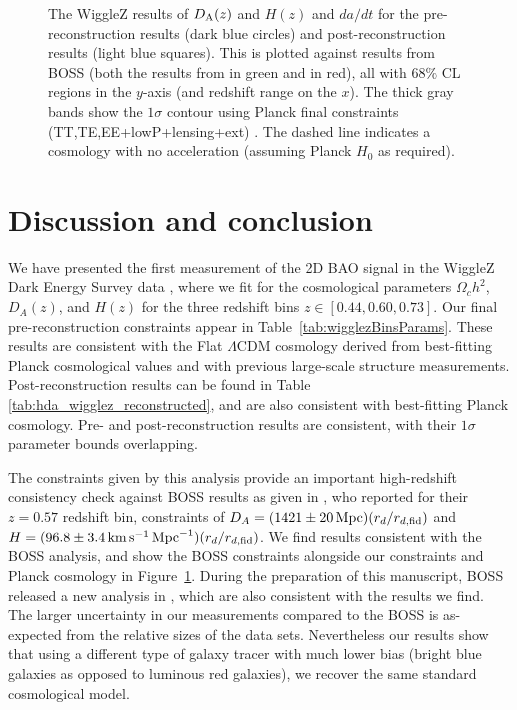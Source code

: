 \documentclass[a4paper,fleqn,usenatbib]{mnras}
\begin{document}
\begin{figure}
\begin{center}
\caption{The WiggleZ results of $D_{\rm A}(z)$ and $H(z)$ and $da/dt$ for the pre-reconstruction results (dark blue circles) and post-reconstruction results (light blue squares). This is plotted against results from BOSS (both the results from \citet{AndersonAubourg2014} in green and \citet{AlamAta2016} in red), all with 68$\%$ CL regions in the $y$-axis (and redshift range on the $x$). The thick gray bands show the $1\sigma$ contour using Planck final constraints (TT,TE,EE+lowP+lensing+ext) \citep{Planck2015Parameters}. The dashed line indicates a cosmology with no acceleration (assuming Planck $H_0$ as required).}
\label{fig:hubble_diagram}
\end{center}
\end{figure}










\section{Discussion and conclusion}

\label{sec:disc}
\label{sec:conclusion}



We have presented the first measurement of the 2D BAO signal in the WiggleZ Dark Energy Survey data \citep{KazinKoda2014}, where we fit for the cosmological parameters $\Omega_c h^2$, $D_A(z)$, and $H(z)$ for the three redshift bins $z \in \left[0.44, 0.60, 0.73\right]$.  Our final pre-reconstruction constraints appear in Table~\ref{tab:wigglezBinsParams}.  These results are consistent with the Flat $\Lambda$CDM cosmology derived from best-fitting Planck cosmological values and with previous large-scale structure measurements. Post-reconstruction results can be found in Table \ref{tab:hda_wigglez_reconstructed}, and are also consistent with best-fitting Planck cosmology. Pre- and post-reconstruction results are consistent, with their $1\sigma$ parameter bounds overlapping.

The constraints given by this analysis provide an important high-redshift consistency check against BOSS results as given in \cite{AndersonAubourg2014DR11}, who reported for their $z=0.57$ redshift bin, constraints of $D_A= (1421\pm20\, {\rm Mpc}) (r_d/r_{d,{\rm fid}})$ and $H = (96.8\pm3.4 \,{\rm km}\,{\rm s}^{-1}\,{\rm Mpc}^{-1})(r_d/r_{d,{\rm fid}})$. We find results consistent with the BOSS analysis, and show the BOSS constraints alongside our constraints and Planck cosmology in Figure~\ref{fig:hubble_diagram}. During the preparation of this manuscript, BOSS released a new analysis in \citet{AlamAta2016}, which are also consistent with the results we find. The larger uncertainty in our measurements compared to the BOSS is as-expected from the relative sizes of the data sets.  Nevertheless our results show that using a different type of galaxy tracer with much lower bias (bright blue galaxies as opposed to luminous red galaxies), we recover the same standard cosmological model. 
\end{document}
